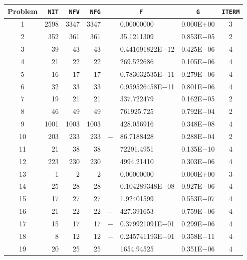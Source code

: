 \documentclass{esub2acm}
\begin{document}
\begin{table}
\footnotesize
\centering
\begin{tabular}{c|rrrr@{}lcc} \hline
Problem\rule[-2pt]{0pt}{12pt} & {\tt NIT} & {\tt NFV} & {\tt NFG} & \multicolumn{2}{c}{\tt F} & {\tt G} & {\tt ITERM} \\ \hline
1\rule[-2pt]{0pt}{12pt} &   2598    &   3347    &   3347    &       &   0.00000000  &   0.000E+00   &   3   \\
2   &   352 &   361 &   361 &       &   35.1211309  &   0.853E$-$05 &   2   \\
3   &   39  &   43  &   43  &       &   0.441691822E$-$12   &   0.425E$-$06 &   4   \\
4   &   21  &   22  &   22  &       &   269.522686  &   0.105E$-$06 &   4   \\
5   &   16  &   17  &   17  &       &   0.783032535E$-$11   &   0.279E$-$06 &   4   \\
6   &   32  &   33  &   33  &       &   0.959526458E$-$11   &   0.801E$-$06 &   4   \\
7   &   19  &   21  &   21  &       &   337.722479  &   0.162E$-$05 &   2   \\
8   &   46  &   49  &   49  &       &   761925.725  &   0.792E$-$04 &   2   \\
9   &   1001    &   1003    &   1003    &       &   428.056916  &   0.348E$-$08 &   4   \\
10  &   203 &   233 &   233 &   $-$ &   86.7188428  &   0.288E$-$04 &   2   \\
11  &   21  &   38  &   38  &       &   72291.4951  &   0.135E$-$10 &   4   \\
12  &   223 &   230 &   230 &       &   4994.21410  &   0.303E$-$06 &   4   \\
13  &   1   &   2   &   2   &       &   0.00000000  &   0.000E+00   &   3   \\
14  &   25  &   28  &   28  &       &   0.104289348E$-$08   &   0.927E$-$06 &   4   \\
15  &   17  &   27  &   27  &       &   1.92401599  &   0.553E$-$07 &   4   \\
16  &   21  &   22  &   22  &   $-$ &   427.391653  &   0.759E$-$06 &   4   \\
17  &   15  &   17  &   17  &   $-$ &   0.379921091E$-$01   &   0.299E$-$06 &   4   \\
18  &   8   &   12  &   12  &   $-$ &   0.245741193E$-$01   &   0.358E$-$11 &   4   \\
19  &   20  &   25  &   25  &       &   1654.94525  &   0.351E$-$06 &   4   \\

\end{tabular}
\end{table}
\end{document}

